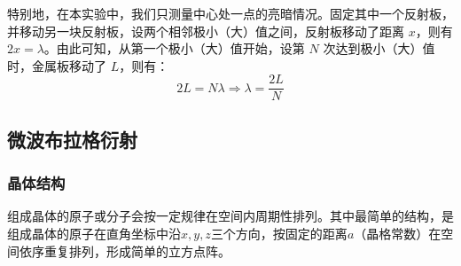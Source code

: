 \documentclass[UTF8]{article}
\theoremstyle{MyLineTheoremStyle} %
\theoremstyle{MyBlockTheoremStyle} %
\theoremstyle{MySubsubsectionStyle} %
\begin{document}
特别地，在本实验中，我们只测量中心处一点的亮暗情况。固定其中一个反射板，并移动另一块反射板，设两个相邻极小（大）值之间，反射板移动了距离 $x$，则有 $2x = \lambda$。由此可知，从第一个极小（大）值开始，设第 $N$ 次达到极小（大）值时，金属板移动了 $L$，则有：
\begin{equation}
    2L = N\lambda \Longrightarrow \lambda = \frac{2L}{N}
\end{equation}

\subsection{微波布拉格衍射}
\subsubsection{晶体结构}
组成晶体的原子或分子会按一定规律在空间内周期性排列。其中最简单的结构，是组成晶体的原子在直角坐标中沿$ x,y,z $三个方向，按固定的距离$ a $（晶格常数）在空间依序重复排列，形成简单的立方点阵。
\end{document}

